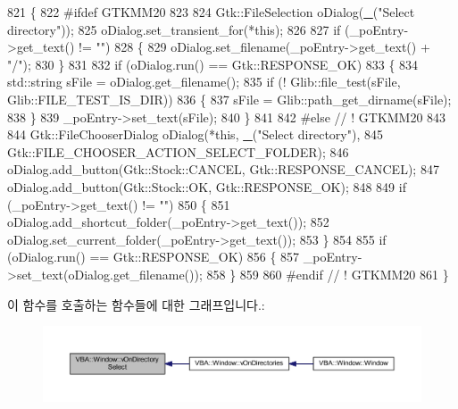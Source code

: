 \begin{DoxyCode}
821 \{
822 \textcolor{preprocessor}{#ifdef GTKMM20}
823 
824   Gtk::FileSelection oDialog(\mbox{\hyperlink{getopt_8c_a86a239addea586602343007a370bf8ad}{\_}}(\textcolor{stringliteral}{"Select directory"}));
825   oDialog.set\_transient\_for(*\textcolor{keyword}{this});
826 
827   \textcolor{keywordflow}{if} (\_poEntry->get\_text() != \textcolor{stringliteral}{""})
828   \{
829     oDialog.set\_filename(\_poEntry->get\_text() + \textcolor{stringliteral}{"/"});
830   \}
831 
832   \textcolor{keywordflow}{if} (oDialog.run() == Gtk::RESPONSE\_OK)
833   \{
834     std::string sFile = oDialog.get\_filename();
835     \textcolor{keywordflow}{if} (! Glib::file\_test(sFile, Glib::FILE\_TEST\_IS\_DIR))
836     \{
837       sFile = Glib::path\_get\_dirname(sFile);
838     \}
839     \_poEntry->set\_text(sFile);
840   \}
841 
842 \textcolor{preprocessor}{#else // ! GTKMM20}
843 
844   Gtk::FileChooserDialog oDialog(*\textcolor{keyword}{this}, \mbox{\hyperlink{getopt_8c_a86a239addea586602343007a370bf8ad}{\_}}(\textcolor{stringliteral}{"Select directory"}),
845                                  Gtk::FILE\_CHOOSER\_ACTION\_SELECT\_FOLDER);
846   oDialog.add\_button(Gtk::Stock::CANCEL, Gtk::RESPONSE\_CANCEL);
847   oDialog.add\_button(Gtk::Stock::OK,     Gtk::RESPONSE\_OK);
848 
849   \textcolor{keywordflow}{if} (\_poEntry->get\_text() != \textcolor{stringliteral}{""})
850   \{
851     oDialog.add\_shortcut\_folder(\_poEntry->get\_text());
852     oDialog.set\_current\_folder(\_poEntry->get\_text());
853   \}
854 
855   \textcolor{keywordflow}{if} (oDialog.run() == Gtk::RESPONSE\_OK)
856   \{
857     \_poEntry->set\_text(oDialog.get\_filename());
858   \}
859 
860 \textcolor{preprocessor}{#endif // ! GTKMM20}
861 \}
\end{DoxyCode}
이 함수를 호출하는 함수들에 대한 그래프입니다.\+:
\nopagebreak
\begin{figure}[H]
\begin{center}
\leavevmode
\includegraphics[width=350pt]{class_v_b_a_1_1_window_ab2aa067d967ea52a685574fc09c11f33_icgraph}
\end{center}
\end{figure}
\mbox{\label{class_v_b_a_1_1_window_a223cab540dae446895699f2ca1494f8e}} 
